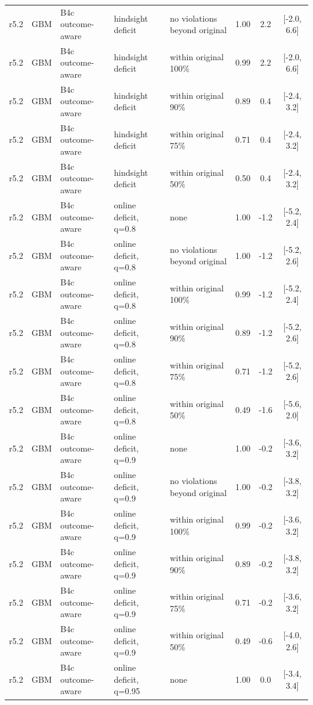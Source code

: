 \begin{longtable}{lllp{4.2cm}p{3.4cm}ccc}
r5.2 & GBM & B4c outcome-aware & hindsight deficit & no violations beyond original & 1.00 & 2.2 & [-2.0, 6.6] \\
r5.2 & GBM & B4c outcome-aware & hindsight deficit & within original 100\% & 0.99 & 2.2 & [-2.0, 6.6] \\
r5.2 & GBM & B4c outcome-aware & hindsight deficit & within original 90\% & 0.89 & 0.4 & [-2.4, 3.2] \\
r5.2 & GBM & B4c outcome-aware & hindsight deficit & within original 75\% & 0.71 & 0.4 & [-2.4, 3.2] \\
r5.2 & GBM & B4c outcome-aware & hindsight deficit & within original 50\% & 0.50 & 0.4 & [-2.4, 3.2] \\
r5.2 & GBM & B4c outcome-aware & online deficit, q=0.8 & none & 1.00 & -1.2 & [-5.2, 2.4] \\
r5.2 & GBM & B4c outcome-aware & online deficit, q=0.8 & no violations beyond original & 1.00 & -1.2 & [-5.2, 2.6] \\
r5.2 & GBM & B4c outcome-aware & online deficit, q=0.8 & within original 100\% & 0.99 & -1.2 & [-5.2, 2.4] \\
r5.2 & GBM & B4c outcome-aware & online deficit, q=0.8 & within original 90\% & 0.89 & -1.2 & [-5.2, 2.6] \\
r5.2 & GBM & B4c outcome-aware & online deficit, q=0.8 & within original 75\% & 0.71 & -1.2 & [-5.2, 2.6] \\
r5.2 & GBM & B4c outcome-aware & online deficit, q=0.8 & within original 50\% & 0.49 & -1.6 & [-5.6, 2.0] \\
r5.2 & GBM & B4c outcome-aware & online deficit, q=0.9 & none & 1.00 & -0.2 & [-3.6, 3.2] \\
r5.2 & GBM & B4c outcome-aware & online deficit, q=0.9 & no violations beyond original & 1.00 & -0.2 & [-3.8, 3.2] \\
r5.2 & GBM & B4c outcome-aware & online deficit, q=0.9 & within original 100\% & 0.99 & -0.2 & [-3.6, 3.2] \\
r5.2 & GBM & B4c outcome-aware & online deficit, q=0.9 & within original 90\% & 0.89 & -0.2 & [-3.8, 3.2] \\
r5.2 & GBM & B4c outcome-aware & online deficit, q=0.9 & within original 75\% & 0.71 & -0.2 & [-3.6, 3.2] \\
r5.2 & GBM & B4c outcome-aware & online deficit, q=0.9 & within original 50\% & 0.49 & -0.6 & [-4.0, 2.6] \\
r5.2 & GBM & B4c outcome-aware & online deficit, q=0.95 & none & 1.00 & 0.0 & [-3.4, 3.4] \\

\end{longtable}
